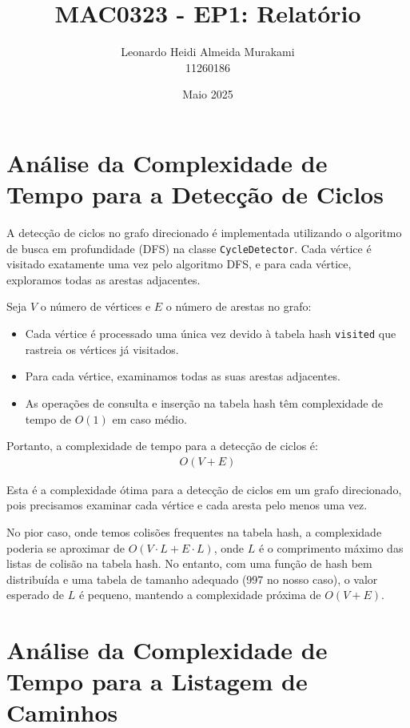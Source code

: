 \documentclass[12pt]{article}
\title{MAC0323 - EP1: Relatório}
\author{Leonardo Heidi Almeida Murakami\\11260186}
\date{Maio 2025}
\begin{document}
\maketitle

\section{Análise da Complexidade de Tempo para a Detecção de Ciclos}

A detecção de ciclos no grafo direcionado é implementada utilizando o algoritmo de busca em profundidade (DFS) na classe \texttt{CycleDetector}. Cada vértice é visitado exatamente uma vez pelo algoritmo DFS, e para cada vértice, exploramos todas as arestas adjacentes.

Seja $V$ o número de vértices e $E$ o número de arestas no grafo:

\begin{itemize}
    \item Cada vértice é processado uma única vez devido à tabela hash \texttt{visited} que rastreia os vértices já visitados.
    \item Para cada vértice, examinamos todas as suas arestas adjacentes.
    \item As operações de consulta e inserção na tabela hash têm complexidade de tempo de $O(1)$ em caso médio.
\end{itemize}

Portanto, a complexidade de tempo para a detecção de ciclos é:
\begin{align}
    O(V + E)
\end{align}

Esta é a complexidade ótima para a detecção de ciclos em um grafo direcionado, pois precisamos examinar cada vértice e cada aresta pelo menos uma vez.

No pior caso, onde temos colisões frequentes na tabela hash, a complexidade poderia se aproximar de $O(V \cdot L + E \cdot L)$, onde $L$ é o comprimento máximo das listas de colisão na tabela hash. No entanto, com uma função de hash bem distribuída e uma tabela de tamanho adequado (997 no nosso caso), o valor esperado de $L$ é pequeno, mantendo a complexidade próxima de $O(V + E)$.

\newpage

\section{Análise da Complexidade de Tempo para a Listagem de Caminhos}
\end{document}
